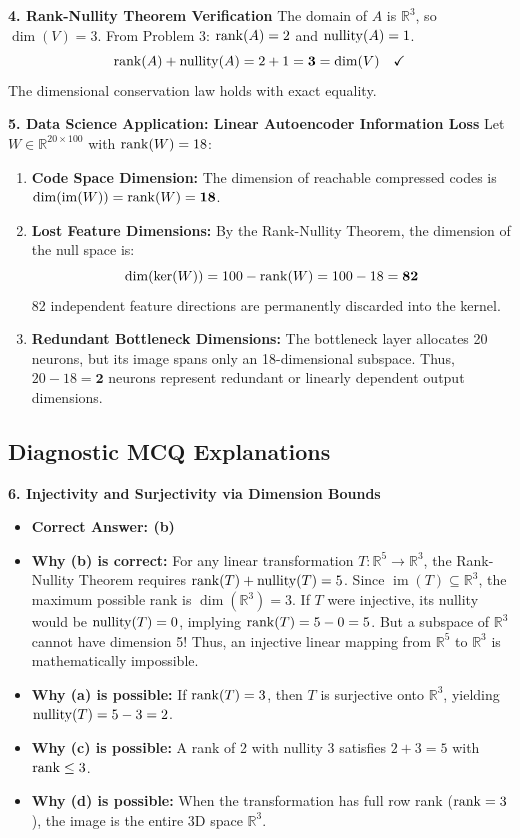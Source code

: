 \textbf{4. Rank-Nullity Theorem Verification}
The domain of $A$ is $\mathbb{R}^3$, so $\dim(V) = 3$.
From Problem 3: $\operatorname{rank}(A) = 2$ and $\operatorname{nullity}(A) = 1$.
\begin{equation*}
\operatorname{rank}(A) + \operatorname{nullity}(A) = 2 + 1 = \mathbf{3} = \dim(V) \quad \checkmark
\end{equation*}
The dimensional conservation law holds with exact equality.

\textbf{5. Data Science Application: Linear Autoencoder Information Loss}
Let $W \in \mathbb{R}^{20 \times 100}$ with $\operatorname{rank}(W) = 18$:
\begin{enumerate}
    \item \textbf{Code Space Dimension:} The dimension of reachable compressed codes is $\dim(\operatorname{im}(W)) = \operatorname{rank}(W) = \mathbf{18}$.
    \item \textbf{Lost Feature Dimensions:} By the Rank-Nullity Theorem, the dimension of the null space is:
    \begin{equation*}
    \dim(\ker(W)) = 100 - \operatorname{rank}(W) = 100 - 18 = \mathbf{82}
    \end{equation*}
    82 independent feature directions are permanently discarded into the kernel.
    \item \textbf{Redundant Bottleneck Dimensions:} The bottleneck layer allocates 20 neurons, but its image spans only an 18-dimensional subspace. Thus, $20 - 18 = \mathbf{2}$ neurons represent redundant or linearly dependent output dimensions.
\end{enumerate}

\subsection*{Diagnostic MCQ Explanations}

\textbf{6. Injectivity and Surjectivity via Dimension Bounds}
\begin{itemize}
    \item \textbf{Correct Answer: (b)}
    \item \textbf{Why (b) is correct:} For any linear transformation $T: \mathbb{R}^5 \to \mathbb{R}^3$, the Rank-Nullity Theorem requires $\operatorname{rank}(T) + \operatorname{nullity}(T) = 5$. Since $\operatorname{im}(T) \subseteq \mathbb{R}^3$, the maximum possible rank is $\dim(\mathbb{R}^3) = 3$. If $T$ were injective, its nullity would be $\operatorname{nullity}(T) = 0$, implying $\operatorname{rank}(T) = 5 - 0 = 5$. But a subspace of $\mathbb{R}^3$ cannot have dimension 5! Thus, an injective linear mapping from $\mathbb{R}^5$ to $\mathbb{R}^3$ is mathematically impossible.
    \item \textbf{Why (a) is possible:} If $\operatorname{rank}(T) = 3$, then $T$ is surjective onto $\mathbb{R}^3$, yielding $\operatorname{nullity}(T) = 5 - 3 = 2$.
    \item \textbf{Why (c) is possible:} A rank of 2 with nullity 3 satisfies $2 + 3 = 5$ with $\operatorname{rank} \le 3$.
    \item \textbf{Why (d) is possible:} When the transformation has full row rank ($\operatorname{rank} = 3$), the image is the entire 3D space $\mathbb{R}^3$.
\end{itemize}

